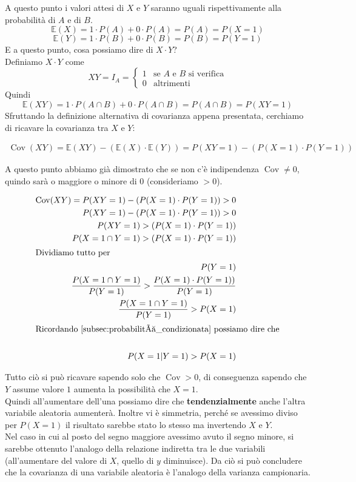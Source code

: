 A questo punto i valori attesi di $X \text{ e } Y$ saranno uguali rispettivamente alla probabilità di $A \text{ e di } B$.
$$\mathbb{E}(X) = 1 \cdot P(A) + 0 \cdot P(A) = P(A) = P(X = 1)$$
$$\mathbb{E}(Y) = 1 \cdot P(B) + 0 \cdot P(B) = P(B) = P(Y = 1)$$
E a questo punto, cosa possiamo dire di $X \cdot Y$? \\
Definiamo $X \cdot Y$ come \[
XY = I_A = \begin{cases}
    1 & \text{se $A$ e $B$ si verifica} \\
    0 & \text{altrimenti}
\end{cases}
\]
Quindi $$\mathbb{E}(XY) = 1 \cdot P(A \cap B) + 0 \cdot P(A \cap B) = P(A \cap B) = P(XY = 1)$$
Sfruttando la definizione alternativa di covarianza appena presentata, cerchiamo di ricavare la covarianza tra $X \text{ e } Y$: 

\begin{align*}
    \operatorname{Cov}(XY) = \mathbb{E}(XY) - (\mathbb{E}(X) \cdot \mathbb{E}(Y)) = P(XY = 1) - (P(X = 1) \cdot P(Y = 1)) 
\end{align*}

\noindent A questo punto abbiamo già dimostrato che se non c'è indipendenza $\operatorname{Cov} \neq 0$, quindo sarà o maggiore o minore di 0 (consideriamo $> 0$).

\begin{align*}
    \operatorname{Cov}(XY) = P(XY = 1) - (P(X = 1) \cdot P(Y = 1)) > 0 \\
    P(XY = 1) - (P(X = 1) \cdot P(Y = 1)) > 0 \\
    P(XY = 1) > (P(X = 1) \cdot P(Y = 1)) \\
     P(X = 1 \cap Y = 1) > (P(X = 1) \cdot P(Y = 1)) \\
    \intertext{Dividiamo tutto per }P(Y = 1) \\
    \frac{P(X = 1 \cap Y = 1)}{P(Y = 1)} > \frac{P(X = 1) \cdot P(Y = 1))}{P(Y = 1)} \\
    \frac{P(X = 1 \cap Y = 1)}{P(Y = 1)} > P(X = 1) \\
    \intertext{Ricordando \ref{subsec:probabilità_condizionata} possiamo dire che} \\
    P(X = 1 | Y = 1) > P(X = 1)
\end{align*}

\noindent Tutto ciò si può ricavare sapendo solo che $\operatorname{Cov} > 0$, di conseguenza sapendo che $Y$ assume valore $1$ aumenta la possibilità che $X = 1$. \\
Quindi all'aumentare dell'una possiamo dire che \textbf{tendenzialmente} anche l'altra variabile aleatoria aumenterà. Inoltre vi è simmetria, perché se avessimo diviso per $P(X = 1)$ il risultato sarebbe stato lo stesso ma invertendo $X \text{ e } Y$. \\
Nel caso in cui al posto del segno maggiore avessimo avuto il segno minore, si sarebbe ottenuto l'analogo della relazione indiretta tra le due variabili (all'aumentare del valore di $X$, quello di $y$ diminuisce). Da ciò si può concludere che la covarianza di una variabile aleatoria è l'analogo della varianza campionaria.

